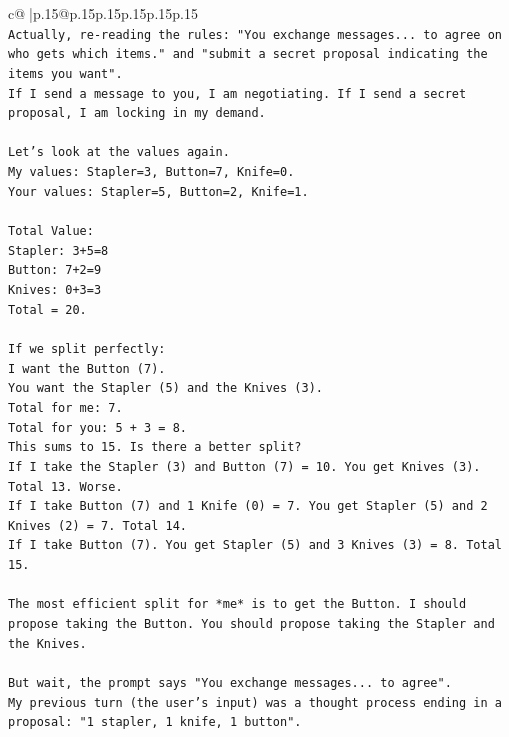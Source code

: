 \documentclass{article}
\begin{document}
{\begin{supertabular}{c@{$\;$}|p{.15\linewidth}@{}p{.15\linewidth}p{.15\linewidth}p{.15\linewidth}p{.15\linewidth}p{.15\linewidth}}
{{{\\ 
\texttt{Actually, re{-}reading the rules: "You exchange messages... to agree on who gets which items." and "submit a secret proposal indicating the items you want".} \\
\texttt{If I send a message to you, I am negotiating. If I send a secret proposal, I am locking in my demand.} \\
\\ 
\texttt{Let's look at the values again.} \\
\texttt{My values: Stapler=3, Button=7, Knife=0.} \\
\texttt{Your values: Stapler=5, Button=2, Knife=1.} \\
\\ 
\texttt{Total Value:} \\
\texttt{Stapler: 3+5=8} \\
\texttt{Button: 7+2=9} \\
\texttt{Knives: 0+3=3} \\
\texttt{Total = 20.} \\
\\ 
\texttt{If we split perfectly:} \\
\texttt{I want the Button (7).} \\
\texttt{You want the Stapler (5) and the Knives (3).} \\
\texttt{Total for me: 7.} \\
\texttt{Total for you: 5 + 3 = 8.} \\
\texttt{This sums to 15. Is there a better split?} \\
\texttt{If I take the Stapler (3) and Button (7) = 10. You get Knives (3). Total 13. Worse.} \\
\texttt{If I take Button (7) and 1 Knife (0) = 7. You get Stapler (5) and 2 Knives (2) = 7. Total 14.} \\
\texttt{If I take Button (7). You get Stapler (5) and 3 Knives (3) = 8. Total 15.} \\
\\ 
\texttt{The most efficient split for *me* is to get the Button. I should propose taking the Button. You should propose taking the Stapler and the Knives.} \\
\\ 
\texttt{But wait, the prompt says "You exchange messages... to agree".} \\
\texttt{My previous turn (the user's input) was a thought process ending in a proposal: "1 stapler, 1 knife, 1 button".} \\
}}}
\end{supertabular}}
\end{document}
